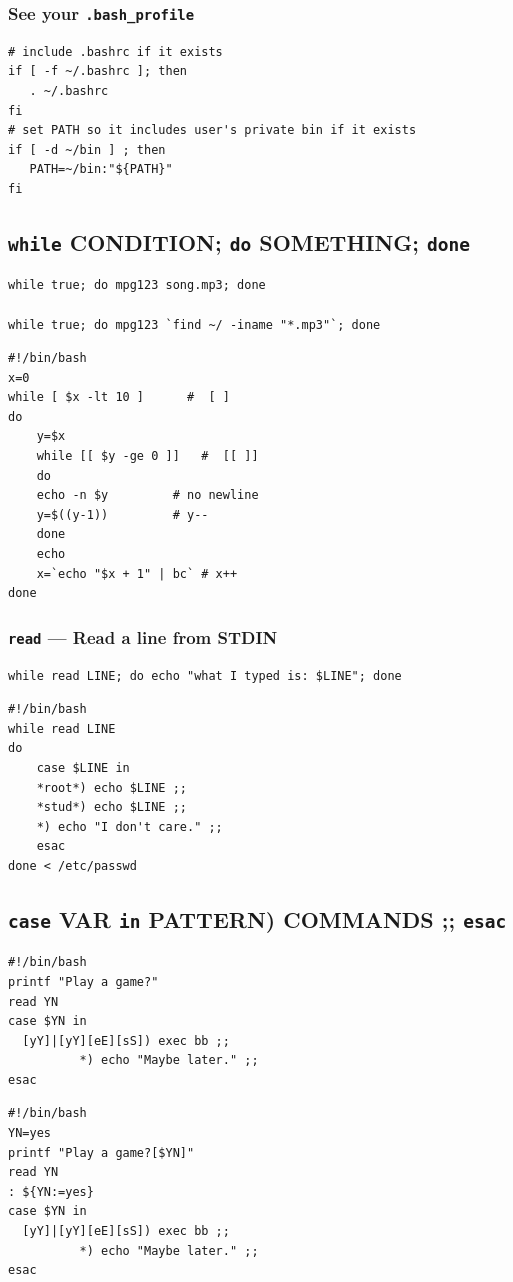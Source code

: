 \documentclass[12pt]{article}
\begin{document}
\subsubsection{See your \texttt{.bash\_profile}}
\label{sec-3-2-3}
\begin{verbatim}
# include .bashrc if it exists
if [ -f ~/.bashrc ]; then
   . ~/.bashrc
fi
# set PATH so it includes user's private bin if it exists
if [ -d ~/bin ] ; then
   PATH=~/bin:"${PATH}"
fi
\end{verbatim}
\subsection{\texttt{while} CONDITION; \texttt{do} SOMETHING; \texttt{done}}
\label{sec-3-3}
\begin{verbatim}
while true; do mpg123 song.mp3; done

while true; do mpg123 `find ~/ -iname "*.mp3"`; done
\end{verbatim}
\begin{verbatim}
#!/bin/bash
x=0 
while [ $x -lt 10 ]      #  [ ]
do 
    y=$x 
    while [[ $y -ge 0 ]]   #  [[ ]]
    do 
	echo -n $y         # no newline
	y=$((y-1))         # y--
    done 
    echo 
    x=`echo "$x + 1" | bc` # x++
done
\end{verbatim}

\subsubsection{\texttt{read} --- Read a line from STDIN}
\label{sec-3-3-1}
\begin{verbatim}
while read LINE; do echo "what I typed is: $LINE"; done
\end{verbatim}
\begin{verbatim}
#!/bin/bash
while read LINE
do
    case $LINE in  
	*root*) echo $LINE ;;
	*stud*) echo $LINE ;;
	*) echo "I don't care." ;;
    esac 
done < /etc/passwd
\end{verbatim}
\subsection{\texttt{case} VAR \texttt{in} PATTERN) COMMANDS ;; \texttt{esac}}
\label{sec-3-4}
\begin{verbatim}
#!/bin/bash
printf "Play a game?" 
read YN 
case $YN in 
  [yY]|[yY][eE][sS]) exec bb ;; 
		  *) echo "Maybe later." ;; 
esac
\end{verbatim}
\begin{verbatim}
#!/bin/bash
YN=yes 
printf "Play a game?[$YN]" 
read YN 
: ${YN:=yes}
case $YN in 
  [yY]|[yY][eE][sS]) exec bb ;; 
		  *) echo "Maybe later." ;; 
esac
\end{verbatim}
\end{document}
